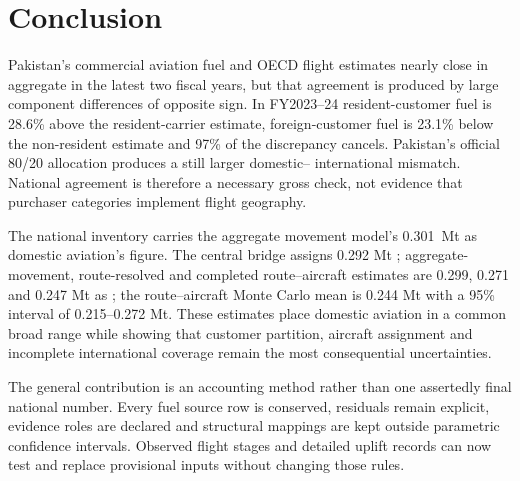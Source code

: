 \section{Conclusion}
\label{sec:conclusion}

Pakistan's commercial aviation fuel and OECD flight estimates nearly close in aggregate in the
latest two fiscal years, but that agreement is produced by large component differences of
opposite sign. In FY2023--24 resident-customer fuel is 28.6\% above the resident-carrier
estimate, foreign-customer fuel is 23.1\% below the non-resident estimate and 97\% of the
discrepancy cancels. Pakistan's official 80/20 allocation produces a still larger domestic--
international mismatch. National agreement is therefore a necessary gross check, not evidence
that purchaser categories implement flight geography.

The national inventory carries the aggregate movement model's \SI{0.301}{\mega\tonne}
\COe{} as domestic aviation's figure. The central bridge assigns 0.292 Mt \COtwo{};
aggregate-movement, route-resolved and completed route--aircraft estimates are 0.299,
0.271 and 0.247 Mt as \COtwo{}; the route--aircraft Monte Carlo mean is 0.244 Mt with a
95\% interval of 0.215--0.272 Mt. These estimates place domestic aviation in a common broad range while showing
that customer partition, aircraft assignment and incomplete international coverage remain the
most consequential uncertainties.

The general contribution is an accounting method rather than one assertedly final national
number. Every fuel source row is conserved, residuals remain explicit, evidence roles are
declared and structural mappings are kept outside parametric confidence intervals. Observed
flight stages and detailed uplift records can now test and replace
provisional inputs without changing those rules.
